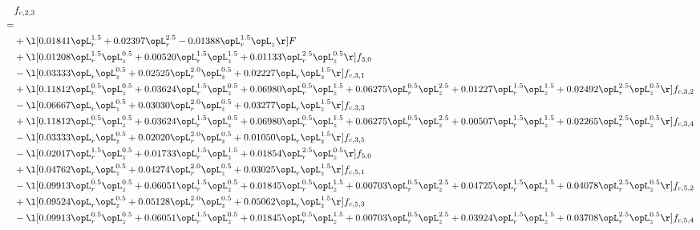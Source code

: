 \begin{alignat}{2} 
\label{eq:f_23_2} 
& f_{c,2,3} \nonumber \\ 
 = \\ 
& + \l[  0.01841 \opL_r^{1.5} +  0.02397 \opL_r^{2.5}   -0.01388 \opL_r^{1.5} \opL_z  \r] F \nonumber \\ 
& + \l[  0.01208 \opL_r^{1.5} \opL_z^{0.5} +  0.00520 \opL_r^{1.5} \opL_z^{1.5} +  0.01133 \opL_r^{2.5} \opL_z^{0.5}  \r] f_{3,0} \nonumber \\ 
& - \l[  0.03333 \opL_r \opL_z^{0.5} +  0.02525 \opL_r^{2.0} \opL_z^{0.5} +  0.02227 \opL_r \opL_z^{1.5}  \r] f_{c,3,1} \nonumber \\ 
& + \l[  0.11812 \opL_r^{0.5} \opL_z^{0.5} +  0.03624 \opL_r^{1.5} \opL_z^{0.5} +  0.06980 \opL_r^{0.5} \opL_z^{1.5} +  0.06275 \opL_r^{0.5} \opL_z^{2.5} +  0.01227 \opL_r^{1.5} \opL_z^{1.5} +  0.02492 \opL_r^{2.5} \opL_z^{0.5}  \r] f_{c,3,2} \nonumber \\ 
& - \l[  0.06667 \opL_r \opL_z^{0.5} +  0.03030 \opL_r^{2.0} \opL_z^{0.5} +  0.03277 \opL_r \opL_z^{1.5}  \r] f_{c,3,3} \nonumber \\ 
& + \l[  0.11812 \opL_r^{0.5} \opL_z^{0.5} +  0.03624 \opL_r^{1.5} \opL_z^{0.5} +  0.06980 \opL_r^{0.5} \opL_z^{1.5} +  0.06275 \opL_r^{0.5} \opL_z^{2.5} +  0.00507 \opL_r^{1.5} \opL_z^{1.5} +  0.02265 \opL_r^{2.5} \opL_z^{0.5}  \r] f_{c,3,4} \nonumber \\ 
& - \l[  0.03333 \opL_r \opL_z^{0.5} +  0.02020 \opL_r^{2.0} \opL_z^{0.5} +  0.01050 \opL_r \opL_z^{1.5}  \r] f_{c,3,5} \nonumber \\ 
& - \l[  0.02017 \opL_r^{1.5} \opL_z^{0.5} +  0.01733 \opL_r^{1.5} \opL_z^{1.5} +  0.01854 \opL_r^{2.5} \opL_z^{0.5}  \r] f_{5,0} \nonumber \\ 
& + \l[  0.04762 \opL_r \opL_z^{0.5} +  0.04274 \opL_r^{2.0} \opL_z^{0.5} +  0.03025 \opL_r \opL_z^{1.5}  \r] f_{c,5,1} \nonumber \\ 
& - \l[  0.09913 \opL_r^{0.5} \opL_z^{0.5} +  0.06051 \opL_r^{1.5} \opL_z^{0.5} +  0.01845 \opL_r^{0.5} \opL_z^{1.5} +  0.00703 \opL_r^{0.5} \opL_z^{2.5} +  0.04725 \opL_r^{1.5} \opL_z^{1.5} +  0.04078 \opL_r^{2.5} \opL_z^{0.5}  \r] f_{c,5,2} \nonumber \\ 
& + \l[  0.09524 \opL_r \opL_z^{0.5} +  0.05128 \opL_r^{2.0} \opL_z^{0.5} +  0.05062 \opL_r \opL_z^{1.5}  \r] f_{c,5,3} \nonumber \\ 
& - \l[  0.09913 \opL_r^{0.5} \opL_z^{0.5} +  0.06051 \opL_r^{1.5} \opL_z^{0.5} +  0.01845 \opL_r^{0.5} \opL_z^{1.5} +  0.00703 \opL_r^{0.5} \opL_z^{2.5} +  0.03924 \opL_r^{1.5} \opL_z^{1.5} +  0.03708 \opL_r^{2.5} \opL_z^{0.5}  \r] f_{c,5,4} \nonumber \\ 

\end{alignat}
